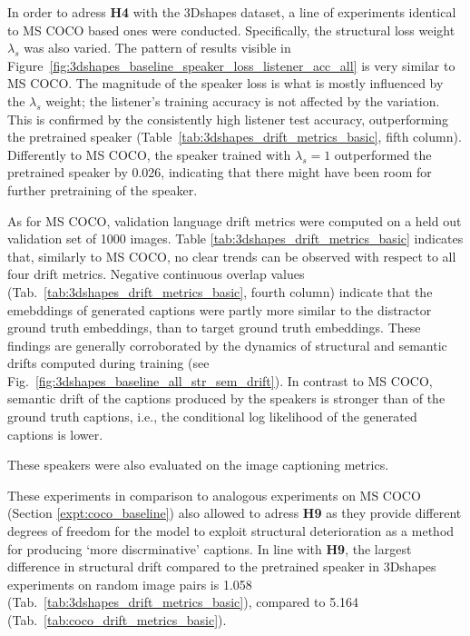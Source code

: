 In order to adress \textbf{H4} with the 3Dshapes dataset, a line of experiments identical to MS COCO based ones were conducted. Specifically, the structural loss weight $\lambda_s$ was also varied. The pattern of results visible in Figure~\ref{fig:3dshapes_baseline_speaker_loss_listener_acc_all} is very similar to MS COCO. The magnitude of the speaker loss is what is mostly influenced by the $\lambda_s$ weight; the listener's training accuracy is not affected by the variation. This is confirmed by the consistently high listener test accuracy, outperforming the pretrained speaker (Table~\ref{tab:3dshapes_drift_metrics_basic}, fifth column). Differently to MS COCO, the speaker trained with $\lambda_s = 1$ outperformed the pretrained speaker by 0.026, indicating that there might have been room for further pretraining of the speaker. 

As for MS COCO, validation language drift metrics were computed on a held out validation set of 1000 images. Table \ref{tab:3dshapes_drift_metrics_basic} indicates that, similarly to MS COCO, no clear trends can be observed with respect to all four drift metrics. Negative continuous overlap values (Tab.~\ref{tab:3dshapes_drift_metrics_basic}, fourth column) indicate that the emebddings of generated captions were partly more similar to the distractor ground truth embeddings, than to target ground truth embeddings. These findings are generally corroborated by the dynamics of structural and semantic drifts computed during training (see Fig.~\ref{fig:3dshapes_baseline_all_str_sem_drift}). In contrast to MS COCO, semantic drift of the captions produced by the speakers is stronger than of the ground truth captions, i.e., the conditional log likelihood of the generated captions is lower. 

These speakers were also evaluated on the image captioning metrics. 

These experiments in comparison to analogous experiments on MS COCO (Section \ref{expt:coco_baseline}) also allowed to adress \textbf{H9} as they provide different degrees of freedom for the model to exploit structural deterioration as a method for producing `more discrminative' captions. In line with \textbf{H9}, the largest difference in structural drift compared to the pretrained speaker in 3Dshapes experiments on random image pairs is 1.058 (Tab.~\ref{tab:3dshapes_drift_metrics_basic}), compared to 5.164 (Tab.~\ref{tab:coco_drift_metrics_basic}). 

